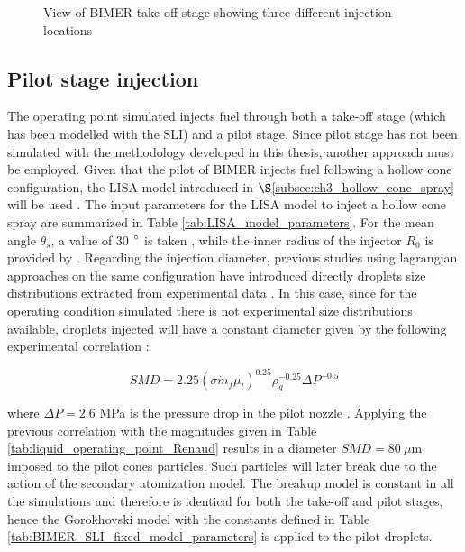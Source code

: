 \begin{figure}[h!]
	\centering	{}
	\caption{View of BIMER take-off stage showing three different injection locations}	\label{fig:BIMER_multipoint_injection_planes_view}
\end{figure}





\subsection{Pilot stage injection}

The operating point simulated injects fuel through both a take-off stage (which has been modelled with the SLI) and a pilot stage. Since pilot stage has not been simulated with the methodology developed in this thesis, another approach must be employed. Given that the pilot of BIMER injects fuel following a hollow cone configuration, the LISA model introduced in $\S$\ref{subsec:ch3_hollow_cone_spray} will be used .   The input parameters for the LISA model to inject a hollow cone spray are summarized in Table \ref{tab:LISA_model_parameters}. For the mean angle $\theta_s$, a value of 30 $\degree$ is taken , while the inner radius of the injector $R_0$ is provided by . Regarding the injection diameter, previous studies using lagrangian approaches on the same configuration have introduced directly droplets size distributions extracted from experimental data . In this case, since for the operating condition simulated there is not experimental size distributions available, droplets injected will have a constant diameter given by the following experimental correlation :

\begin{equation}
SMD = 2.25 \left( \sigma \dot{m}_f \mu_l \right)^{0.25} \rho_g^{-0.25}  \Delta P^{-0.5}
\end{equation}

where $\Delta P = 2.6$ MPa is the pressure drop in the pilot nozzle . Applying the previous correlation with the magnitudes given in Table \ref{tab:liquid_operating_point_Renaud} results in a diameter $SMD = 80~\mu$m imposed to the pilot cones particles. Such particles will later break due to the action of the secondary atomization model. The breakup model is constant in all the simulations and therefore is identical for both the take-off and pilot stages, hence the Gorokhovski model with the constants defined in Table \ref{tab:BIMER_SLI_fixed_model_parameters} is applied to the pilot droplets. 

